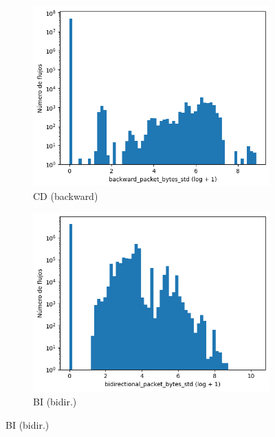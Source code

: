\begin{figure}[H]
\begin{subfigure}[b]{0.26\textwidth}
        \includegraphics[width=\textwidth]{media/packet_pincer_cicddos/backward_packet_bytes_std_log_x_log_y.png}
        \caption{CD (backward)} \label{fig:packet_pincer_packet_bytes_std_cd_bw}
    \end{subfigure}
    \hfill
    \begin{subfigure}[b]{0.26\textwidth}
        \centering
        \includegraphics[width=\linewidth]{media/packet_pincer_botiot/bidirectional_packet_bytes_std_log_x_log_y.png}
        \caption{BI (bidir.)}

\end{subfigure}
\end{figure}
